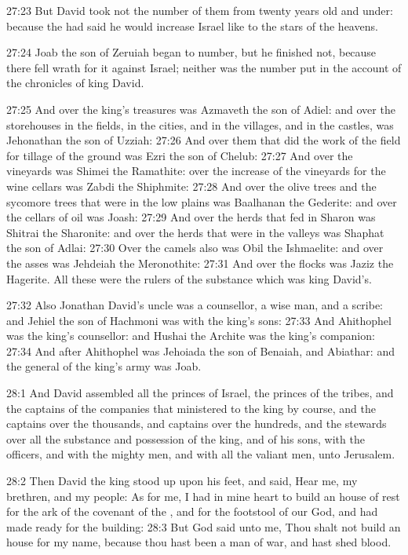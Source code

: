27:23 But David took not the number of them from twenty years old and
under: because the \LORD had said he would increase Israel like to the
stars of the heavens.

27:24 Joab the son of Zeruiah began to number, but he finished not,
because there fell wrath for it against Israel; neither was the number
put in the account of the chronicles of king David.

27:25 And over the king's treasures was Azmaveth the son of Adiel: and
over the storehouses in the fields, in the cities, and in the
villages, and in the castles, was Jehonathan the son of Uzziah: 27:26
And over them that did the work of the field for tillage of the ground
was Ezri the son of Chelub: 27:27 And over the vineyards was Shimei
the Ramathite: over the increase of the vineyards for the wine cellars
was Zabdi the Shiphmite: 27:28 And over the olive trees and the
sycomore trees that were in the low plains was Baalhanan the Gederite:
and over the cellars of oil was Joash: 27:29 And over the herds that
fed in Sharon was Shitrai the Sharonite: and over the herds that were
in the valleys was Shaphat the son of Adlai: 27:30 Over the camels
also was Obil the Ishmaelite: and over the asses was Jehdeiah the
Meronothite: 27:31 And over the flocks was Jaziz the Hagerite. All
these were the rulers of the substance which was king David's.

27:32 Also Jonathan David's uncle was a counsellor, a wise man, and a
scribe: and Jehiel the son of Hachmoni was with the king's sons: 27:33
And Ahithophel was the king's counsellor: and Hushai the Archite was
the king's companion: 27:34 And after Ahithophel was Jehoiada the son
of Benaiah, and Abiathar: and the general of the king's army was Joab.

28:1 And David assembled all the princes of Israel, the princes of the
tribes, and the captains of the companies that ministered to the king
by course, and the captains over the thousands, and captains over the
hundreds, and the stewards over all the substance and possession of
the king, and of his sons, with the officers, and with the mighty men,
and with all the valiant men, unto Jerusalem.

28:2 Then David the king stood up upon his feet, and said, Hear me, my
brethren, and my people: As for me, I had in mine heart to build an
house of rest for the ark of the covenant of the \LORD, and for the
footstool of our God, and had made ready for the building: 28:3 But
God said unto me, Thou shalt not build an house for my name, because
thou hast been a man of war, and hast shed blood.

